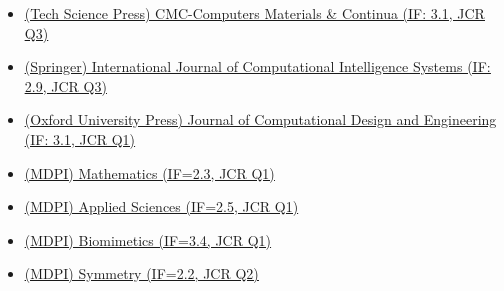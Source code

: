 \documentclass[11pt,a4paper,sans]{moderncv}
\renewcommand{\underline}[1]{\uline{#1}}
\begin{document}
{  %
{\begin{itemize}[label=\textbullet] 
      \item {\color{orange}\href{https://www.techscience.com/journal/cmc}{\underline{(Tech Science Press) CMC-Computers Materials \& Continua (IF: 3.1, JCR Q3)}}}
      \item {\color{orange}\href{https://link.springer.com/journal/44196}{\underline{(Springer) International Journal of Computational Intelligence Systems (IF: 2.9, JCR Q3)}}}
      \item {\color{orange}\href{https://academic.oup.com/jcde}{\underline{(Oxford University Press) Journal of Computational Design and Engineering (IF: 3.1, JCR Q1)}}}
      \item {\color{orange}\href{https://www.mdpi.com/journal/mathematics}{\underline{(MDPI) Mathematics (IF=2.3, JCR Q1)}}}
      \item {\color{orange}\href{https://www.mdpi.com/journal/mathematics}{\underline{(MDPI) Applied Sciences (IF=2.5, JCR Q1)}}}
      \item {\color{orange}\href{https://www.mdpi.com/journal/biomimetics}{\underline{(MDPI) Biomimetics (IF=3.4, JCR Q1)}}}
      \item {\color{orange}\href{https://www.mdpi.com/journal/mathematics}{\underline{(MDPI) Symmetry (IF=2.2, JCR Q2)}}}
  \end{itemize}}
  
}
\end{document}
